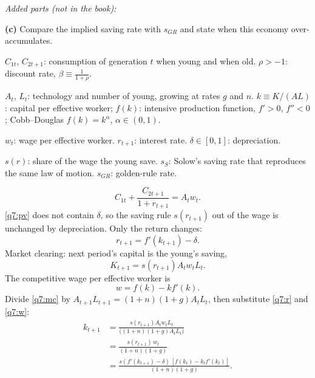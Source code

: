 \noindent\textit{Added parts (not in the book):}\par\nopagebreak
\textbf{(c)} Compare the implied saving rate with $s_{GR}$ and state when this economy over-accumulates.
\resolespaco
\begin{sol}
\begin{notacao}
\item $C_{1t}$, $C_{2t+1}$: consumption of generation $t$ when young and when old. $\rho>-1$: discount rate, $\beta\equiv\frac1{1+\rho}$.
\item $A_t$, $L_t$: technology and number of young, growing at rates $g$ and $n$. $k\equiv K/(AL)$: capital per effective worker;
$f(k)$: intensive production function, $f'>0$, $f''<0$; Cobb--Douglas $f(k)=k^\alpha$, $\alpha\in(0,1)$.
\item $w_t$: wage per effective worker. $r_{t+1}$: interest rate. $\delta\in[0,1]$: depreciation.
\item $s(r)$: share of the wage the young save. $s_S$: Solow's saving rate that reproduces the same law of motion. $s_{GR}$: golden-rule rate.
\end{notacao}
\begin{equation}
C_{1t}+\frac{C_{2t+1}}{1+r_{t+1}}=A_tw_t. \label{q7:pv}
\end{equation}
\eqref{q7:pv} does not contain $\delta$, so the saving rule $s(r_{t+1})$ out of the wage is unchanged by depreciation. Only the return
changes:
\begin{equation}
r_{t+1}=f'(k_{t+1})-\delta. \label{q7:r}
\end{equation}
Market clearing: next period's capital is the young's saving,
\begin{equation}
K_{t+1}=s(r_{t+1})A_tw_tL_t. \label{q7:mc}
\end{equation}
The competitive wage per effective worker is
\begin{equation}
w=f(k)-kf'(k). \label{q7:w}
\end{equation}
Divide \eqref{q7:mc} by $A_{t+1}L_{t+1}=(1+n)(1+g)A_tL_t$, then substitute \eqref{q7:r} and \eqref{q7:w}:
\begin{align}
k_{t+1} &= \frac{s(r_{t+1})A_tw_tL_t}{\big((1+n)(1+g)A_tL_t\big)}\nonumber\\
&= \frac{s(r_{t+1})\,w_t}{(1+n)(1+g)}\nonumber\\
&= \frac{s(f'(k_{t+1})-\delta)\,[f(k_t)-k_tf'(k_t)]}{(1+n)(1+g)}. \label{q7:lom}
\end{align}

\end{sol}
